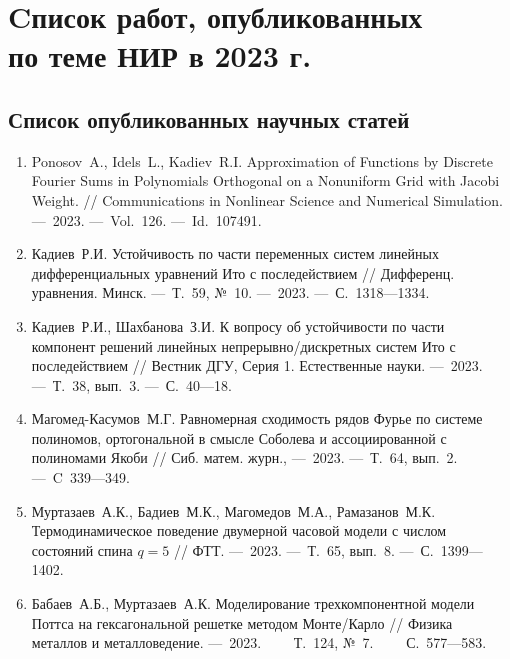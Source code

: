\chapter{Cписок работ, опубликованных \texorpdfstring{\\ }{} по теме НИР в 2023 г.}


\section*{Список опубликованных научных статей}

\begin{enumerate}

    \item
    \foreignlanguage{english}{%
        Ponosov~A., Idels~L., Kadiev~R.I.
        Approximation of Functions by Discrete Fourier Sums in Polynomials Orthogonal on a Nonuniform Grid with Jacobi Weight.
        //
        Communications in Nonlinear Science and Numerical Simulation. 
        ---~2023.
        ---~Vol.~126.
        ---~Id.~107491.
    }

    \item 
    Кадиев~Р.И. 
    Устойчивость по части переменных систем линейных дифференциальных уравнений Ито с последействием 
    //
    Дифференц. уравнения. Минск. 
    ---~Т.~59, №~10.
    ---~2023. 
    ---~С.~1318---1334.

    \item 
    Кадиев~Р.И., Шахбанова~З.И. 
    К вопросу об устойчивости по части компонент решений линейных непрерывно\-/дискретных систем Ито с последействием 
    // 
    Вестник ДГУ, Серия 1. Естественные науки. 
    ---~2023.
    ---~Т.~38, вып.~3.
    ---~С.~40---18.

    \item
    Магомед-Касумов~М.Г. 
    Равномерная сходимость рядов Фурье по системе полиномов, ортогональной в смысле Соболева и ассоциированной с полиномами Якоби 
    // 
    Сиб. матем. журн., 
    ---~2023.
    ---~Т.~64, вып.~2.
    ---~C~339---349.

    \item
    Муртазаев~А.К., Бадиев~М.К., Магомедов~М.А., Рамазанов~М.К. 
    Термодинамическое поведение двумерной часовой модели с числом состояний спина $q = 5$ 
    // 
    ФТТ.
    ---~2023.
    ---~Т.~65, вып.~8.
    ---~С.~1399---1402.

    \item
    Бабаев~А.Б., Муртазаев~А.К. 
    Моделирование трехкомпонентной модели Поттса на гексагональной решетке методом Монте\-/Карло 
    // 
    Физика металлов и металловедение. 
    ---~2023.
    ~~~~Т.~124, №~7.
    ~~~~С.~577---583.


\end{enumerate}
